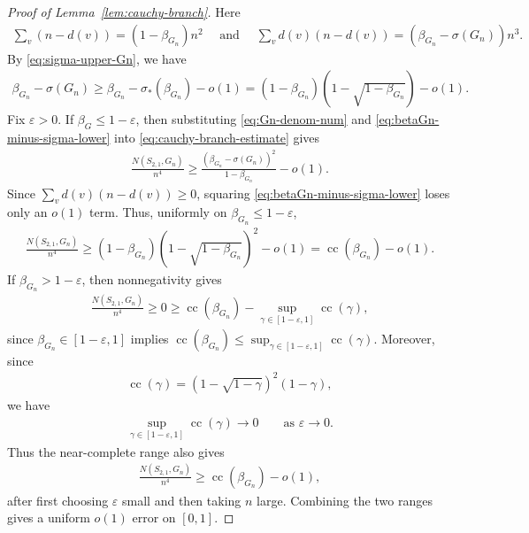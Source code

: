 \documentclass[10pt,a4paper]{article}
\newcommand{\cc}{\operatorname{cc}}
\begin{document}
\begin{proof}[Proof of Lemma~\ref{lem:cauchy-branch}]
Here
\begin{align}\label{eq:Gn-denom-num}
  \sum_v(n-d(v))=(1-\beta_{G_n})n^2\quad\text{ and }\quad \sum_v d(v)(n-d(v))
  =(\beta_{G_n}-\sigma(G_n))n^3.
\end{align}
By \eqref{eq:sigma-upper-Gn}, we have
\begin{align}\label{eq:betaGn-minus-sigma-lower}
  \beta_{G_n}-\sigma(G_n)
  \ge \beta_{G_n}-\sigma_*(\beta_{G_n})-o(1)
  =(1-\beta_{G_n})(1-\sqrt{1-\beta_{G_n}})-o(1).
\end{align}
Fix $\varepsilon>0$.  If $\beta_G\le1-\varepsilon$, then substituting \eqref{eq:Gn-denom-num} and \eqref{eq:betaGn-minus-sigma-lower} into \eqref{eq:cauchy-branch-estimate} gives
\begin{align*}
  \frac{N(S_{2,1},G_n)}{n^4}\ge\frac{(\beta_{G_n}-\sigma(G_n))^2}{1-\beta_{G_n}}-o(1).
\end{align*}
Since $\sum_vd(v)(n-d(v))\ge0$, squaring  \eqref{eq:betaGn-minus-sigma-lower} loses only an $o(1)$ term.  Thus, uniformly on
$\beta_{G_n}\le1-\varepsilon$,
\begin{align*}
  \frac{N(S_{2,1},G_n)}{n^4}
  \ge (1-\beta_{G_n})(1-\sqrt{1-\beta_{G_n}})^2-o(1)
  =\cc(\beta_{G_n})-o(1).
\end{align*}
If $\beta_{G_n}>1-\varepsilon$, then nonnegativity gives
\begin{align*}
  \frac{N(S_{2,1},G_n)}{n^4}
  \ge0\ge \cc(\beta_{G_n})-\sup_{\gamma\in[1-\varepsilon,1]}\cc(\gamma),
\end{align*}
since $\beta_{G_n}\in[1-\varepsilon,1]$ implies
$
  \cc(\beta_{G_n})\le\sup_{\gamma\in[1-\varepsilon,1]}\cc(\gamma).
$
Moreover, since
\begin{align*}
  \cc(\gamma)=(1-\sqrt{1-\gamma})^2(1-\gamma),
\end{align*}
we have
\begin{align*}
  \sup_{\gamma\in[1-\varepsilon,1]}\cc(\gamma)\to0
  \qquad\text{as }\varepsilon\to0.
\end{align*}
Thus the near-complete range also gives
\begin{align*}
  \frac{N(S_{2,1},G_n)}{n^4}\ge \cc(\beta_{G_n})-o(1),
\end{align*}
after first choosing $\varepsilon$ small and then taking $n$ large.  Combining
the two ranges gives a uniform $o(1)$ error on $[0,1]$.


\end{proof}
\end{document}
